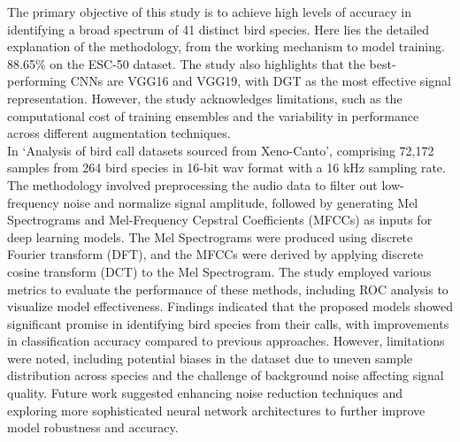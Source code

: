 The primary objective of this study is to achieve high levels of accuracy in
identifying a broad spectrum of 41 distinct bird species. Here lies the
detailed explanation of the methodology, from the working mechanism to model
training. 88.65\% on the ESC-50 dataset. The study also highlights that the
best-performing CNNs are VGG16 and VGG19, with DGT as the most effective signal
representation. However, the study acknowledges limitations, such as the
computational cost of training ensembles and the variability in performance
across different augmentation techniques.\\

In\cite{wang2022efficient} `Analysis of bird call datasets sourced from
Xeno-Canto', comprising 72,172 samples from 264 bird species in 16-bit wav
format with a 16 kHz sampling rate. The methodology involved preprocessing the
audio data to filter out low-frequency noise and normalize signal amplitude,
followed by generating Mel Spectrograms and Mel-Frequency Cepstral Coefficients
(MFCCs) as inputs for deep learning models. The Mel Spectrograms were produced
using discrete Fourier transform (DFT), and the MFCCs were derived by applying
discrete cosine transform (DCT) to the Mel Spectrogram. The study employed
various metrics to evaluate the performance of these methods, including ROC
analysis to visualize model effectiveness. Findings indicated that the proposed
models showed significant promise in identifying bird species from their calls,
with improvements in classification accuracy compared to previous approaches.
However, limitations were noted, including potential biases in the dataset due
to uneven sample distribution across species and the challenge of background
noise affecting signal quality. Future work suggested enhancing noise reduction
techniques and exploring more sophisticated neural network architectures to
further improve model robustness and accuracy.\\

